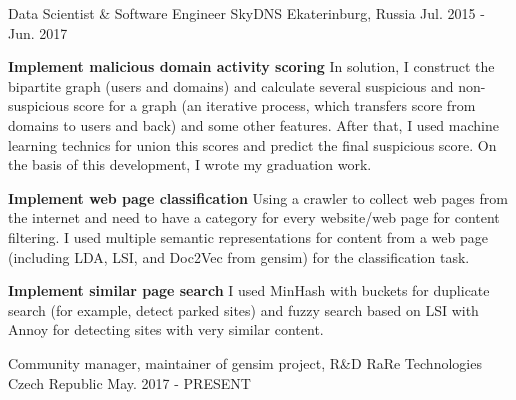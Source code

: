 


\begin{cventries}


\cventry
{Data Scientist \& Software Engineer} %
{SkyDNS} %
{Ekaterinburg, Russia} %
{Jul. 2015 - Jun. 2017} %
{ %
\begin{cvitems}
\item {\textbf{Implement malicious domain activity scoring} \newline In solution, I construct the bipartite graph (users and domains) and calculate several suspicious and non-suspicious score for a graph (an iterative process, which transfers score from domains to users and back) and some other features. After that, I used machine learning technics for union this scores and predict the final suspicious score. On the basis of this development, I wrote my graduation work.}
\item {\textbf{Implement web page classification} \newline Using a crawler to collect web pages from the internet and need to have a category for every website/web page for content filtering. I used multiple semantic representations for content from a web page  (including LDA, LSI, and Doc2Vec from gensim) for the classification task.}
\item {\textbf{Implement similar page search} \newline I used MinHash with buckets for duplicate search (for example, detect parked sites) and fuzzy search based on LSI with Annoy for detecting sites with very similar content.}
\end{cvitems}
}

\cventry
{Community manager, maintainer of gensim project, R\&D} %
{RaRe Technologies} %
{Czech Republic} %
{May. 2017 - PRESENT}
{
}


\end{cventries}